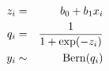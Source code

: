 \documentclass[fleqn,papersize]{jsarticle}
\begin{document}
\begin{eqnarray*}
	z_{i} &=& b_{0} + b_{1}x_{i} \\
	q_{i} &=& \frac{1}{1+\exp(-z_{i})} \\
	y_{i} &\sim& {\rm Bern}(q_{i})
\end{eqnarray*}
\end{document}
